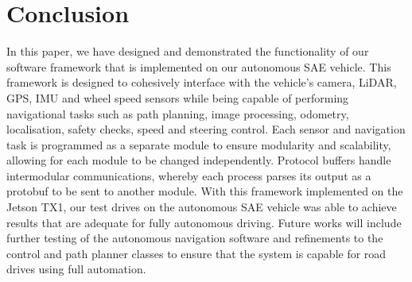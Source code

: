 \section{Conclusion}
In this paper, we have designed and demonstrated the functionality of our software framework that is implemented on our autonomous SAE vehicle. This framework is designed to cohesively interface with the vehicle's camera, LiDAR, GPS, IMU and wheel speed sensors while being capable of performing navigational tasks such as path planning, image processing, odometry, localisation, safety checks, speed and steering control. Each sensor and navigation task is programmed as a separate module to ensure modularity and scalability, allowing for each module to be changed independently. Protocol buffers handle intermodular communications, whereby each process parses its output as a protobuf to be sent to another module. With this framework implemented on the Jetson TX1, our test drives on the autonomous SAE vehicle was able to achieve results that are adequate for fully autonomous driving. Future works will include further testing of the autonomous navigation software and refinements to the control and path planner classes to ensure that the system is capable for road drives using full automation. 